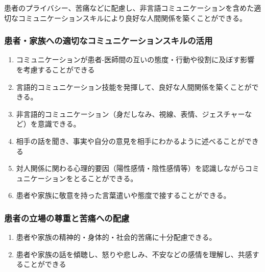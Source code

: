 患者のプライバシー、苦痛などに配慮し、非言語コミュニケーションを含めた適切なコミュニケーションスキルにより良好な人間関係を築くことができる。

\hypertarget{ux60a3ux8005ux5bb6ux65cfux3078ux306eux9069ux5207ux306aux30b3ux30dfux30e5ux30cbux30b1ux30fcux30b7ux30e7ux30f3ux30b9ux30adux30ebux306eux6d3bux7528}{%
\subsubsection{患者・家族への適切なコミュニケーションスキルの活用}\label{ux60a3ux8005ux5bb6ux65cfux3078ux306eux9069ux5207ux306aux30b3ux30dfux30e5ux30cbux30b1ux30fcux30b7ux30e7ux30f3ux30b9ux30adux30ebux306eux6d3bux7528}}

\begin{enumerate}
\def\labelenumi{\arabic{enumi}.}
\tightlist
\item
  コミュニケーションが患者-医師間の互いの態度・行動や役割に及ぼす影響を考慮することができる
\item
  言語的コミュニケーション技能を発揮して、良好な人間関係を築くことができる。
\item
  非言語的コミュニケーション（身だしなみ、視線、表情、ジェスチャーなど）を意識できる。
\item
  相手の話を聞き、事実や自分の意見を相手にわかるように述べることができる
\item
  対人関係に関わる心理的要因（陽性感情・陰性感情等）を認識しながらコミュニケーションをとることができる。
\item
  患者や家族に敬意を持った言葉遣いや態度で接することができる。
\end{enumerate}

\hypertarget{ux60a3ux8005ux306eux7acbux5834ux306eux5c0aux91cdux3068ux82e6ux75dbux3078ux306eux914dux616e}{%
\subsubsection{患者の立場の尊重と苦痛への配慮}\label{ux60a3ux8005ux306eux7acbux5834ux306eux5c0aux91cdux3068ux82e6ux75dbux3078ux306eux914dux616e}}

\begin{enumerate}
\def\labelenumi{\arabic{enumi}.}
\tightlist
\item
  患者や家族の精神的・身体的・社会的苦痛に十分配慮できる。
\item
  患者や家族の話を傾聴し、怒りや悲しみ、不安などの感情を理解し、共感することができる
\end{enumerate}


